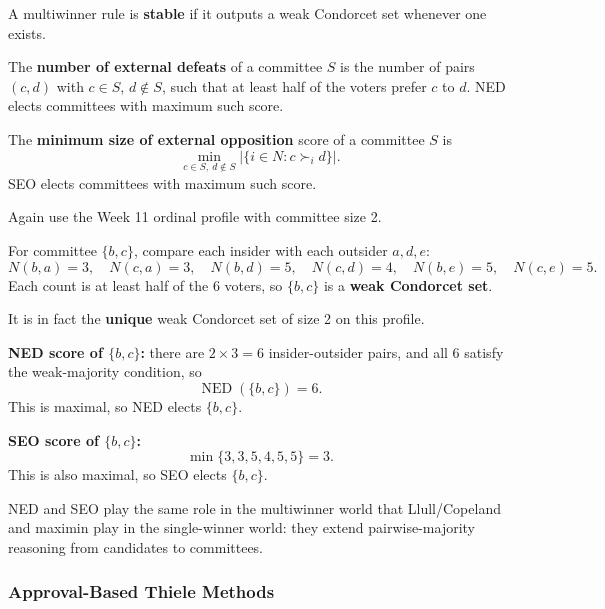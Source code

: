 \begin{defbox}
A multiwinner rule is \textbf{stable} if it outputs a weak Condorcet set whenever one exists.
\end{defbox}

\begin{defbox}[NED]
The \textbf{number of external defeats} of a committee $S$ is the number of pairs $(c,d)$ with $c\in S$, $d\notin S$, such that at least half of the voters prefer $c$ to $d$. NED elects committees with maximum such score.
\end{defbox}

\begin{defbox}[SEO]
The \textbf{minimum size of external opposition} score of a committee $S$ is
\[
  \min_{c\in S,\ d\notin S} |\{i\in N : c \succ_i d\}|.
\]
SEO elects committees with maximum such score.
\end{defbox}

\begin{exbox}
Again use the Week 11 ordinal profile with committee size 2.

For committee $\{b,c\}$, compare each insider with each outsider $a,d,e$:
\[
  N(b,a)=3,\quad N(c,a)=3,\quad N(b,d)=5,\quad N(c,d)=4,\quad N(b,e)=5,\quad N(c,e)=5.
\]
Each count is at least half of the 6 voters, so $\{b,c\}$ is a \textbf{weak Condorcet set}.

It is in fact the \textbf{unique} weak Condorcet set of size 2 on this profile.

\textbf{NED score of $\{b,c\}$:} there are $2 \times 3 = 6$ insider-outsider pairs, and all 6 satisfy the weak-majority condition, so
\[
  \operatorname{NED}(\{b,c\})=6.
\]
This is maximal, so NED elects $\{b,c\}$.

\textbf{SEO score of $\{b,c\}$:}
\[
  \min\{3,3,5,4,5,5\}=3.
\]
This is also maximal, so SEO elects $\{b,c\}$.
\end{exbox}

\begin{tipbox}
NED and SEO play the same role in the multiwinner world that Llull/Copeland and maximin play in the single-winner world: they extend pairwise-majority reasoning from candidates to committees.
\end{tipbox}

\separator

\subsubsection{Approval-Based Thiele Methods}

